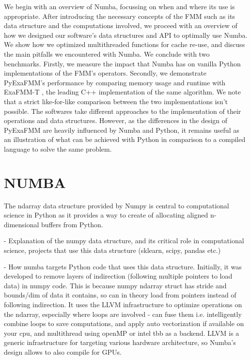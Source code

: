 \documentclass{IEEEcsmag}
\begin{document}
We begin with an overview of Numba, focussing on when and where its use is appropriate. After introducing the necessary concepts of the FMM such as its data structure and the computations involved, we proceed with an overview of how we designed our software's data structures and API to optimally use Numba. We show how we optimized multithreaded functions for cache re-use, and discuss the main pitfalls we encountered with Numba. We conclude with two benchmarks. Firstly, we measure the impact that Numba has on vanilla Python implementations of the FMM's operators. Secondly, we demonstrate PyExaFMM's performance by comparing memory usage and runtime with ExaFMM-T \cite{Wang2021}, the leading C++ implementation of the same algorithm. We note that a strict like-for-like comparison between the two implementations isn't possible. The softwares take different approaches to the implementation of their operations and data structures. However, as the differences in the design of PyExaFMM are heavily influenced by Numba and Python, it remains useful as an illustration of what can be achieved with Python in comparison to a compiled language to solve the same problem.

\section{NUMBA}

The ndarray data structure provided by Numpy is central to computational science in Python as it provides a way to create of allocating aligned n-dimensional buffers from Python.

- Explanation of the numpy data structure, and its critical role in computational science, projects that use this data structure (sklearn, scipy, pandas etc.)

- How numba targets Python code that uses this data structure. Initially, it was developed to remove layers of indirection (following multiple pointers to load data) in numpy code. This is because numpy ndarray struct has stride and bounds/dim of data it contains, so can in theory load from pointers instead of following indirection. It uses the LLVM infrastructure to optimize operations on the ndarray, especially where loops are involved - can fuse them i.e. intelligently combine loops to save computations, and apply auto vectorization if available on your cpu, and multithread using openMP or intel tbb as a backend. LLVM is a generic infrastructure for targeting various hardware architecture, so Numba's design allows to also compile for GPUs.
\end{document}
